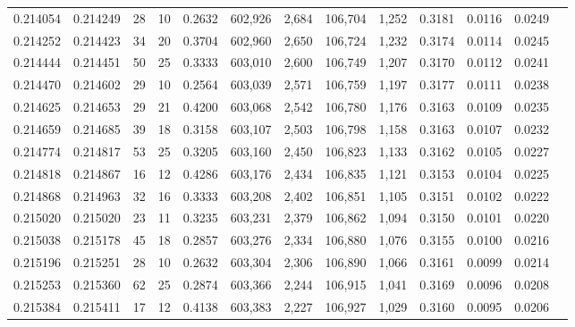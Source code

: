 \begin{tabular}{rrrrrrrrrrrrr}
0.214054 & 0.214249 &    28 &  10 &                                     0.2632 & 602,926 &   2,684 & 106,704 &   1,252 & 0.3181 & 0.0116 & 0.0249 \\
0.214252 & 0.214423 &    34 &  20 &                                     0.3704 & 602,960 &   2,650 & 106,724 &   1,232 & 0.3174 & 0.0114 & 0.0245 \\
0.214444 & 0.214451 &    50 &  25 &                                     0.3333 & 603,010 &   2,600 & 106,749 &   1,207 & 0.3170 & 0.0112 & 0.0241 \\
0.214470 & 0.214602 &    29 &  10 &                                     0.2564 & 603,039 &   2,571 & 106,759 &   1,197 & 0.3177 & 0.0111 & 0.0238 \\
0.214625 & 0.214653 &    29 &  21 &                                     0.4200 & 603,068 &   2,542 & 106,780 &   1,176 & 0.3163 & 0.0109 & 0.0235 \\
0.214659 & 0.214685 &    39 &  18 &                                     0.3158 & 603,107 &   2,503 & 106,798 &   1,158 & 0.3163 & 0.0107 & 0.0232 \\
0.214774 & 0.214817 &    53 &  25 &                                     0.3205 & 603,160 &   2,450 & 106,823 &   1,133 & 0.3162 & 0.0105 & 0.0227 \\
0.214818 & 0.214867 &    16 &  12 &                                     0.4286 & 603,176 &   2,434 & 106,835 &   1,121 & 0.3153 & 0.0104 & 0.0225 \\
0.214868 & 0.214963 &    32 &  16 &                                     0.3333 & 603,208 &   2,402 & 106,851 &   1,105 & 0.3151 & 0.0102 & 0.0222 \\
0.215020 & 0.215020 &    23 &  11 &                                     0.3235 & 603,231 &   2,379 & 106,862 &   1,094 & 0.3150 & 0.0101 & 0.0220 \\
0.215038 & 0.215178 &    45 &  18 &                                     0.2857 & 603,276 &   2,334 & 106,880 &   1,076 & 0.3155 & 0.0100 & 0.0216 \\
0.215196 & 0.215251 &    28 &  10 &                                     0.2632 & 603,304 &   2,306 & 106,890 &   1,066 & 0.3161 & 0.0099 & 0.0214 \\
0.215253 & 0.215360 &    62 &  25 &                                     0.2874 & 603,366 &   2,244 & 106,915 &   1,041 & 0.3169 & 0.0096 & 0.0208 \\
0.215384 & 0.215411 &    17 &  12 &                                     0.4138 & 603,383 &   2,227 & 106,927 &   1,029 & 0.3160 & 0.0095 & 0.0206 \\

\end{tabular}
